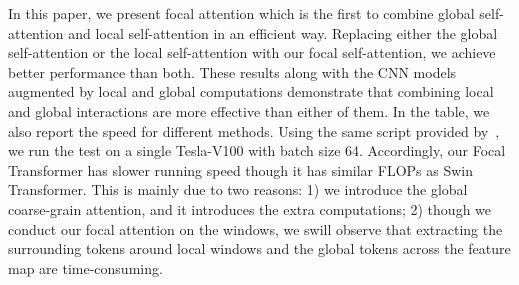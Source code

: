 \documentclass{article}
\begin{document}
In this paper, we present focal attention which is the first to combine global self-attention and local self-attention in an efficient way. Replacing either the global self-attention or the local self-attention with our focal self-attention, we achieve better performance than both. These results along with the CNN models augmented by local and global computations demonstrate that combining local and global interactions are more effective than either of them. In the table, we also report the speed for different methods. Using the same script provided by~\cite{liu2021swin}, we run the test on a single Tesla-V100 with batch size 64. Accordingly, our Focal Transformer has slower running speed though it has similar FLOPs as Swin Transformer. This is mainly due to two reasons: 1) we introduce the global coarse-grain attention, and it introduces the extra computations; 2) though we conduct our focal attention on the windows, we swill observe that extracting the surrounding tokens around local windows and the global tokens across the feature map are time-consuming.
\end{document}
